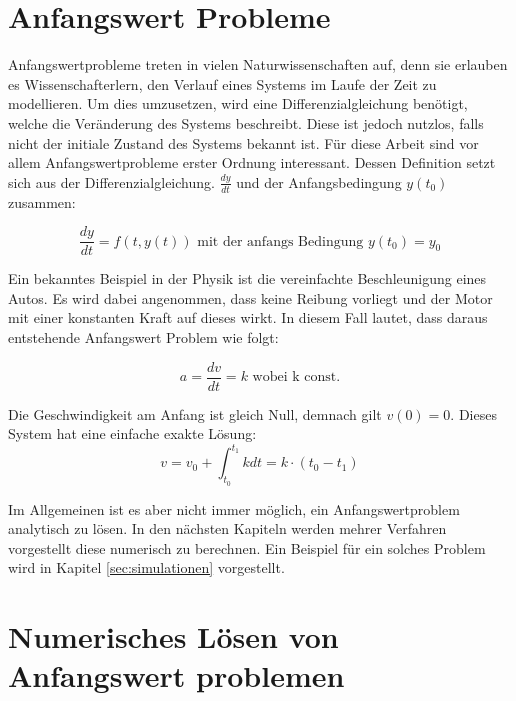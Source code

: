 
\section{Anfangswert Probleme} \label{sec:anfangswert_probleme}

Anfangswertprobleme treten in vielen Naturwissenschaften auf, denn sie erlauben es Wissenschafterlern, 
den Verlauf eines Systems im Laufe der Zeit zu modellieren.
Um dies umzusetzen, wird eine Differenzialgleichung benötigt, welche die Veränderung des Systems beschreibt.
Diese ist jedoch nutzlos, falls nicht der initiale Zustand des Systems bekannt ist.
Für diese Arbeit sind vor allem Anfangswertprobleme erster Ordnung interessant.
Dessen Definition setzt sich aus der Differenzialgleichung. $\frac{dy}{dt}$ und der Anfangsbedingung $y(t_0)$ zusammen:

$$
\frac{dy}{dt} = f(t, y(t)) \text{ mit der anfangs Bedingung } y(t_0) = y_0
$$

Ein bekanntes Beispiel in der Physik ist die vereinfachte Beschleunigung eines Autos.
Es wird dabei angenommen, dass keine Reibung vorliegt und der Motor mit einer konstanten Kraft auf dieses wirkt.
In diesem Fall lautet, dass daraus entstehende Anfangswert Problem wie folgt:

$$
a = \frac{dv}{dt} = k \text{ wobei k const.}
$$

Die Geschwindigkeit am Anfang ist gleich Null, demnach gilt  $v(0) = 0$.
Dieses System hat eine einfache exakte Lösung:
$$
v = v_0 + \int_{t_0}^{t_1} k dt = k \cdot (t_0 - t_1) 
$$

Im Allgemeinen ist es aber nicht immer möglich, 
ein Anfangswertproblem analytisch zu lösen. 
In den nächsten Kapiteln werden mehrer Verfahren vorgestellt diese numerisch zu berechnen.
Ein Beispiel für ein solches Problem wird in Kapitel \ref{sec:simulationen} vorgestellt.

\section{Numerisches Lösen von Anfangswert problemen} \label{sec:numerisches_lösen_von_anfangswert_problemen}

